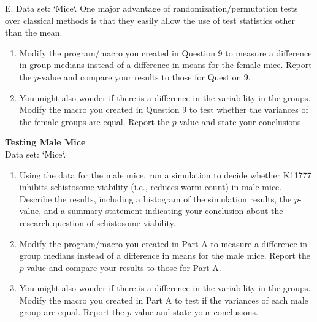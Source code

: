 \documentclass[
]{report}
\newcounter{excount}
\renewcommand{\theexcount}{E\arabic{excount}}
\begin{document}
\begin{list}{\theexcount.}{ \setlength{\itemsep}{0.5em}}
  Data set: `Mice`. One major advantage of randomization/permutation tests over classical methods is that they easily allow the use of test statistics other than the mean.
  \begin{enumerate}
    \setcounter{enumi}{0}  
    \item Modify the program/macro you created in Question 9 to measure a difference in group medians instead of a difference in means for the female mice. Report the $p$-value and compare your results to those for Question 9.
    \item You might also wonder if there is a difference in the variability in the groups. Modify the macro
you created in Question 9 to test whether the variances of the female groups are equal. Report the
$p$-value and state your conclusions
  \end{enumerate}
  
  \item \textbf{Testing Male Mice} \\
  Data set: `Mice`. 
  \begin{enumerate}
    \setcounter{enumi}{0}  
    \item Using the data for the male mice, run a simulation to decide whether K11777 inhibits schistosome
viability (i.e., reduces worm count) in male mice. Describe the results, including a histogram
of the simulation results, the $p$-value, and a summary statement indicating your conclusion
about the research question of schistosome viability.
    \item Modify the program/macro you created in Part A to measure a difference in group medians
instead of a difference in means for the male mice. Report the $p$-value and compare your results
to those for Part A.
    \item You might also wonder if there is a difference in the variability in the groups. Modify the macro
you created in Part A to test if the variances of each male group are equal. Report the $p$-value and
state your conclusions.
  \end{enumerate}
  
  
  

\end{list}
\end{document}
